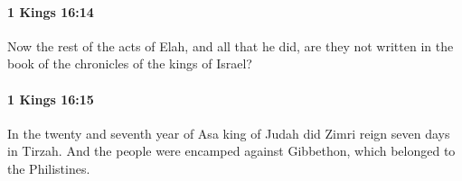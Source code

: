 		\paragraph{1 Kings 16:14} %
			\label{1KINGS-16-14}

			Now the rest of the acts of Elah, and all that he did, are they not written in the book of the chronicles of the kings of Israel?


		\paragraph{1 Kings 16:15} %
			\label{1KINGS-16-15}

			In the twenty and seventh year of Asa king of Judah did Zimri reign seven days in Tirzah. And the people were encamped against Gibbethon, which belonged to the Philistines.


